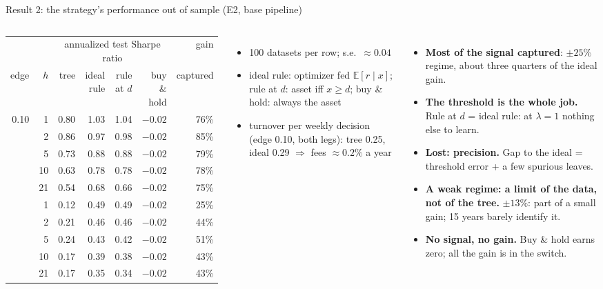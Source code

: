 \documentclass[10pt,aspectratio=169]{beamer}
\newcommand{\1}{\mathbf{1}}
\newcommand{\E}{\mathbb{E}}
\begin{document}
\begin{frame}{Result 2: the strategy's performance out of sample (E2, base pipeline)}
\begin{columns}[T]
\scriptsize\setlength{\tabcolsep}{3pt}
\begin{tabular}{@{}rr rrrr r@{}}
\toprule
& & \multicolumn{4}{c}{annualized test Sharpe ratio} & gain\\
\cmidrule(lr){3-6}
edge & $h$ & tree & ideal rule & rule at $d$ & buy \& hold & captured\\
\midrule
0.10 & 1 & 0.80 & 1.03 & 1.04 & $-0.02$ & 76\%\\
 & 2 & 0.86 & 0.97 & 0.98 & $-0.02$ & 85\%\\
 & 5 & 0.73 & 0.88 & 0.88 & $-0.02$ & 79\%\\
 & 10 & 0.63 & 0.78 & 0.78 & $-0.02$ & 78\%\\
 & 21 & 0.54 & 0.68 & 0.66 & $-0.02$ & 75\%\\
\addlinespace
0.05 & 1 & 0.12 & 0.49 & 0.49 & $-0.02$ & 25\%\\
 & 2 & 0.21 & 0.46 & 0.46 & $-0.02$ & 44\%\\
 & 5 & 0.24 & 0.43 & 0.42 & $-0.02$ & 51\%\\
 & 10 & 0.17 & 0.39 & 0.38 & $-0.02$ & 43\%\\
 & 21 & 0.17 & 0.35 & 0.34 & $-0.02$ & 43\%\\
\bottomrule
\end{tabular}

\smallskip
\begin{itemize}
\item 100 datasets per row; s.e.\ $\approx0.04$
\item ideal rule: optimizer fed $\E[r\mid x]$; rule at $d$: asset iff $x\ge d$; buy \& hold: always the asset
\item turnover per weekly decision (edge 0.10, both legs): tree 0.25, ideal 0.29 $\Rightarrow$ fees $\approx0.2\%$ a year
\end{itemize}
\small
\begin{itemize}
\item \textbf{Most of the signal captured}: $\pm25\%$ regime, about three quarters of the ideal gain.
\item \textbf{The threshold is the whole job.} Rule at $d$ = ideal rule: at $\lambda=1$ nothing else to learn.
\item \textbf{Lost: precision.} Gap to the ideal = threshold error + a few spurious leaves.
\item \textbf{A weak regime: a limit of the data, not of the tree.} $\pm13\%$: part of a small gain; 15 years barely identify it.
\item \textbf{No signal, no gain.} Buy \& hold earns zero; all the gain is in the switch.
\end{itemize}
\end{columns}
\end{frame}
\end{document}
